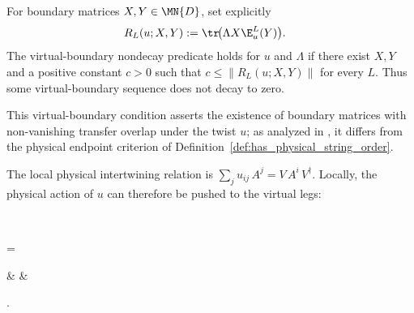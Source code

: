 \begin{definition}\label{def:has_string_order}
    \leanok
    For boundary matrices $X,Y\in\MN{D}$, set explicitly
    \begin{align}
        R_L(u;X,Y)
         & :=\tr\!\bigl(\Lambda X\E_u^L(Y)\bigr).
        \notag
    \end{align}
    The virtual-boundary nondecay predicate holds for $u$ and
    $\Lambda$ if there exist $X,Y$ and a positive constant $c>0$ such that
    $c\le\|R_L(u;X,Y)\|$ for every $L$. Thus some virtual-boundary sequence
    does not decay to zero.

    This virtual-boundary condition asserts the existence of boundary matrices
    with non-vanishing transfer overlap under the twist $u$; as analyzed in
    \cite{gap:pgwsvc08_string_order_virtual_boundary}, it differs from the
    physical endpoint criterion of Definition~\ref{def:has_physical_string_order}.
\end{definition}

\begin{definition}\label{def:condC1}
    \leanok
    The local physical intertwining relation is
    $\sum_j u_{ij}\, A^j = V\, A^i\, V^\dagger$.
    Locally, the physical action of $u$ can therefore be pushed to the virtual
    legs:
    \begin{tenkzequation}
        \tenkzkernel
        \begin{tenkz}[rows={op,ket}, cols=1]
             \\
        \end{tenkz}
        =
        \begin{tenkz}[boundary=open]
             &  &
        \end{tenkz}.
    \end{tenkzequation}
\end{definition}


